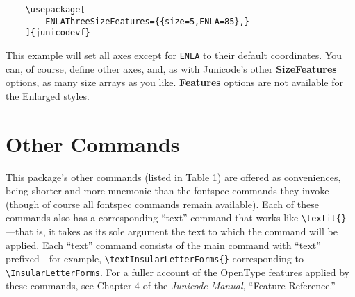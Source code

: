 \documentclass[12pt]{article}
\newcommand{\fspec}{{\sffamily fontspec}}
\newcommand{\src}[1]{{\color{BrickRed}\texttt{#1}}}
\begin{document}
\footnotesize
\begin{verbatim}
    \usepackage[
        ENLAThreeSizeFeatures={{size=5,ENLA=85},}
    ]{junicodevf}
\end{verbatim}
\normalsize

\noindent This example will set all axes except for \src{ENLA} to their default coordinates.
You can, of course, define other axes, and, as with Junicode’s other \textbf{SizeFeatures} options,
as many size arrays as you like. \textbf{Features} options are not available for the Enlarged 
styles.

\section{Other Commands}

This package's other commands (listed in Table 1) are offered as conveniences, being shorter and more
mnemonic than the {\fspec} commands they invoke (though of course all {\fspec} commands
remain available). Each of these commands
also has a corresponding “text” command that works like 
{\color{BrickRed}\verb|\textit{}|}—that is, it takes
as its sole argument the text to which the command will be applied. Each “text” command
consists of the main command with “text” prefixed—for example,
{\color{BrickRed}\verb|\textInsularLetterForms{}|}
corresponding to {\color{BrickRed}\verb|\InsularLetterForms|}.  For a fuller account of the OpenType features
applied by these commands, see Chapter 4 of the \textit{Junicode Manual}, “Feature Reference.”
\end{document}
